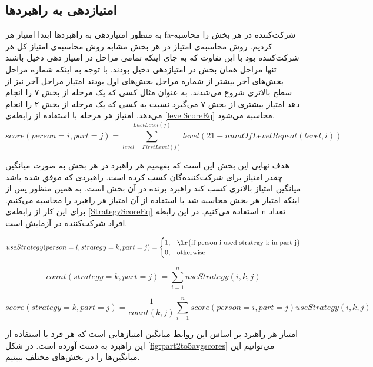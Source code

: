 \documentclass[twoside, a4paper,11pt]{book}
\numberwithin{equation}{chapter}
\numberwithin{table}{chapter}
\numberwithin{figure}{chapter}
\numberwithin{equation}{chapter}
\newcommand{\mls}[1]{\gls{fa-#1}\glsuseri{la-#1}}
\begin{document}
\subsection{امتیازدهی به راهبرد‌ها}
به منظور امتیازدهی به راهبرد‌ها ابتدا امتیاز هر  \mls{شرکت‌کننده} در هر بخش را محاسبه کردیم. روش محاسبه‌ی امتیاز در هر بخش مشابه روش محاسبه‌ی امتیاز کل هر شرکت‌کننده بود با این تفاوت که به جای اینکه تمامی مراحل در امتیاز دهی دخیل باشند تنها مراحل همان بخش در امتیازدهی دخیل بودند. با توجه به اینکه شماره مراحل بخش‌های آخر بیشتر از شماره مراحل بخش‌های اول بودند امتیاز مراحل آخر نیز از سطح بالاتری شروع می‌شدند. به عنوان مثال کسی که یک مرحله از بخش ۷ را انجام دهد امتیاز بیشتری از بخش ۷ می‌گیرد نسبت به کسی که یک مرحله از بخش ۲ را انجام می‌دهد. امتیاز هر مرحله با استفاده از رابطه‌ی \ref{levelScoreEq} محاسبه می‌شود.
\begin{equation}
\label{levelScoreEq}
	score(person = i, part = j) = \sum_{level = FirstLevel(j)}^{LastLevel(j)} level(21-numOfLevelRepeat(level, i))
\end{equation}

هدف نهایی این بخش این است که بفهمیم هر راهبرد در هر بخش به صورت میانگین چقدر امتیاز برای شرکت‌کننده‌گان کسب کرده است. راهبرد‌ی که موفق شده باشد میانگین امتیاز بالاتری کسب کند راهبرد برنده در آن بخش است. به همین منظور پس از اینکه امتیاز هر بخش محاسبه شد با استفاده از آن امتیاز هر راهبرد را محاسبه می‌کنیم. برای این کار از رابطه‌ی \ref{StrategyScoreEq} استفاده می‌کنیم. در این رابطه n  تعداد افراد شرکت‌کننده در آزمایش است. 

\begin{equation}
\label{UseStrategyEq}
useStrategy(person = i, strategy = k, part = j) =\begin{cases}
    1 ,& \text{\lr{if person i used strategy k in part j}} \\
    0 , & \text{otherwise}
    \end{cases}
\end{equation}


\begin{equation}
count(strategy = k, part = j) = \sum_{i=1}^{n} useStrategy(i, k, j)
\end{equation}

\begin{equation}
\label{StrategyScoreEq}
	score(strategy = k, part = j) = \frac{1}{count(k, j)} \sum_{i=1}^{n} score(person = i, part = j) useStrategy(i, k, j)
\end{equation}


امتیاز هر راهبرد بر اساس این روابط میانگین امتیازهایی است که هر فرد با استفاده از این راهبرد به دست آورده است. در شکل   \ref{fig:part2to5avgscores} می‌توانیم این میانگین‌ها را در بخش‌های مختلف ببینیم.
\end{document}
